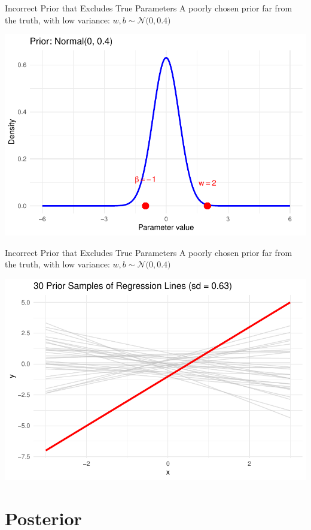 \documentclass{beamer}
\begin{document}
\begin{frame}{Incorrect Prior that Excludes True Parameters}
  A poorly chosen prior far from the truth, with low variance:
  \(
    w, b \sim \mathcal{N}\big(0, 0.4\big)
  \)


  \begin{center}
    \includegraphics[width=0.8\linewidth]{prior_1_3.pdf}
  \end{center}
\end{frame}

\begin{frame}{Incorrect Prior that Excludes True Parameters}
  A poorly chosen prior far from the truth, with low variance:
  \(
    w, b \sim \mathcal{N}\big(0, 0.4\big)
  \)

  \begin{center}
    \includegraphics[width=0.8\linewidth]{prior_2_3.pdf}
  \end{center}
\end{frame}

\section{Posterior}
\end{document}
